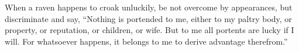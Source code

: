 When a  raven happens to croak  unluckily, be not overcome  by appearances, but
discriminate and say,  ``Nothing is portended to me, either  to my paltry body,
or property, or  reputation, or children, or  wife. But to me  all portents are
lucky if I will.  For whatsoever happens, it belongs to  me to derive advantage
therefrom.''
